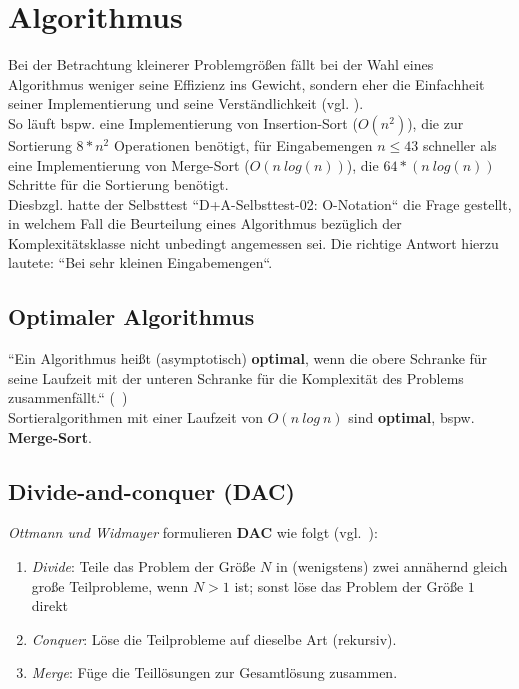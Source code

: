 \section{Algorithmus}

Bei der Betrachtung kleinerer Problemgrößen fällt bei der Wahl eines Algorithmus weniger seine Effizienz ins Gewicht, sondern eher die Einfachheit seiner Implementierung und seine Verständlichkeit (vgl. \cite[5 f.]{GD18a}).\\

\noindent
So läuft bspw. eine Implementierung von Insertion-Sort ($O(n^2)$), die zur Sortierung $8*n^2$ Operationen benötigt, für Eingabemengen $n \leq 43$ schneller als eine Implementierung von Merge-Sort ($O(n\ log(n))$), die $64 * (n\ log(n))$ Schritte für die Sortierung benötigt.\\

\noindent
Diesbzgl. hatte der Selbsttest ``D+A-Selbsttest-02: O-Notation`` die Frage gestellt, in welchem Fall die Beurteilung eines Algorithmus bezüglich der Komplexitätsklasse nicht unbedingt angemessen sei. Die richtige Antwort hierzu lautete: ``Bei sehr kleinen Eingabemengen``.\\

\subsection{Optimaler Algorithmus}
\begin{tcolorbox}[title={Optimaler Algorithmus}]
    ``Ein Algorithmus heißt (asymptotisch) \textbf{optimal}, wenn die obere Schranke für seine Laufzeit mit der unteren Schranke für die Komplexität des Problems zusammenfällt.`` (~\cite[20]{GD18a})\\

    \noindent
    Sortieralgorithmen mit einer Laufzeit von $O(n\ log\ n)$ sind \textbf{optimal}, bspw. \textbf{Merge-Sort}.
\end{tcolorbox}


\subsection{Divide-and-conquer (DAC)}

\textit{Ottmann und Widmayer} formulieren \textbf{DAC} wie folgt (vgl.~\cite[9]{OW17a}):

\begin{tcolorbox}[title={Divide-and-conquer-Verfahren zur Lösung eines Problems der Größe N}]
   \begin{enumerate}
       \item \textit{Divide}: Teile das Problem der Größe $N$ in (wenigstens) zwei annähernd gleich große Teilprobleme, wenn $N > 1$ ist; sonst löse das Problem der Größe $1$ direkt
       \item \textit{Conquer}: Löse die Teilprobleme auf dieselbe Art (rekursiv).
       \item \textit{Merge}: Füge die Teillösungen zur Gesamtlösung zusammen.
   \end{enumerate}
\end{tcolorbox}
